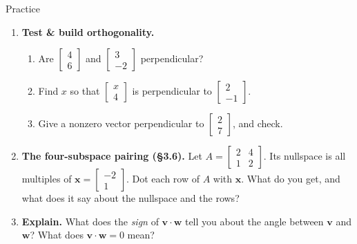 \documentclass[10pt]{article}
\newcommand{\vv}{\mathbf{v}}
\newcommand{\ww}{\mathbf{w}}
\newcommand{\xx}{\mathbf{x}}
\begin{document}
\begin{notesbox}{Practice}
\begin{enumerate}[leftmargin=1.9em, itemsep=12pt]
\begin{enumerate}[label=(\alph*), leftmargin=1.8em, itemsep=4pt]
    \end{enumerate}
    \vspace{1.0cm}
  \item \textbf{Test \& build orthogonality.}
    \begin{enumerate}[label=(\alph*), leftmargin=1.8em, itemsep=6pt]
      \item Are $\begin{bmatrix} 4 \\ 6 \end{bmatrix}$ and $\begin{bmatrix} 3 \\ -2 \end{bmatrix}$ perpendicular? \vspace{0.6cm}
      \item Find $x$ so that $\begin{bmatrix} x \\ 4 \end{bmatrix}$ is perpendicular to $\begin{bmatrix} 2 \\ -1 \end{bmatrix}$. \vspace{0.6cm}
      \item Give a nonzero vector perpendicular to $\begin{bmatrix} 2 \\ 7 \end{bmatrix}$, and check. \vspace{0.6cm}
    \end{enumerate}
  \item \textbf{The four-subspace pairing (§3.6).} Let $A=\begin{bmatrix} 2 & 4 \\ 1 & 2 \end{bmatrix}$.
        Its nullspace is all multiples of $\xx=\begin{bmatrix} -2 \\ 1 \end{bmatrix}$. Dot each row of
        $A$ with $\xx$. What do you get, and what does it say about the nullspace and the rows?
  \item \textbf{Explain.} What does the \emph{sign} of $\vv\cdot\ww$ tell you about the angle
        between $\vv$ and $\ww$? What does $\vv\cdot\ww=0$ mean? 
\end{enumerate}
\end{notesbox}
\end{document}
